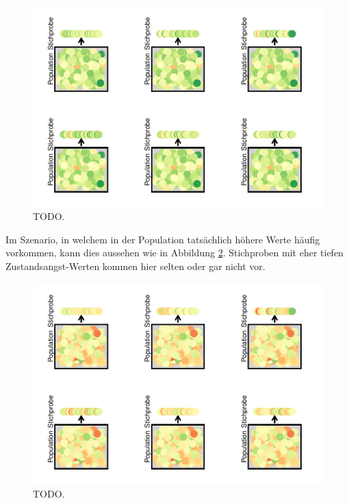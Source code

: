 \documentclass[
]{book}
\theoremstyle{definition}
\theoremstyle{definition}
\theoremstyle{definition}
\theoremstyle{definition}
\theoremstyle{remark}
\begin{document}
\begin{figure}
\centering
\includegraphics{aps_statistik1_files/figure-latex/srs-intervall-high-p-many-1.pdf}
\caption{\label{fig:srs-intervall-high-p-many}TODO.}
\end{figure}

Im Szenario, in welchem in der Population tatsächlich höhere Werte häufig vorkommen, kann dies aussehen wie in Abbildung \ref{fig:srs-intervall-low-p-many}. Stichproben mit eher tiefen Zustandsangst-Werten kommen hier selten oder gar nicht vor.

\begin{figure}
\centering
\includegraphics{aps_statistik1_files/figure-latex/srs-intervall-low-p-many-1.pdf}
\caption{\label{fig:srs-intervall-low-p-many}TODO.}
\end{figure}
\end{document}
